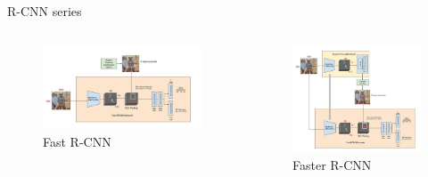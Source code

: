 \begin{frame}{R-CNN series}
	\begin{columns}
		\begin{column}{0.5\textwidth}
			\begin{figure}[h]
				\centering
				\includegraphics[width=\textwidth]{images/fast-rcnn.jpeg}
				\caption{Fast R-CNN}
				\label{fig:fast-rcnn}
			\end{figure}
		\end{column}
		\begin{column}{0.5\textwidth}
			\begin{figure}[h]
				\centering
				\includegraphics[width=\textwidth]{images/faster-rcnn.jpeg}
				\caption{Faster R-CNN}
				\label{fig:faster-rcnn}
			\end{figure}
		\end{column}
	\end{columns}
\end{frame}

